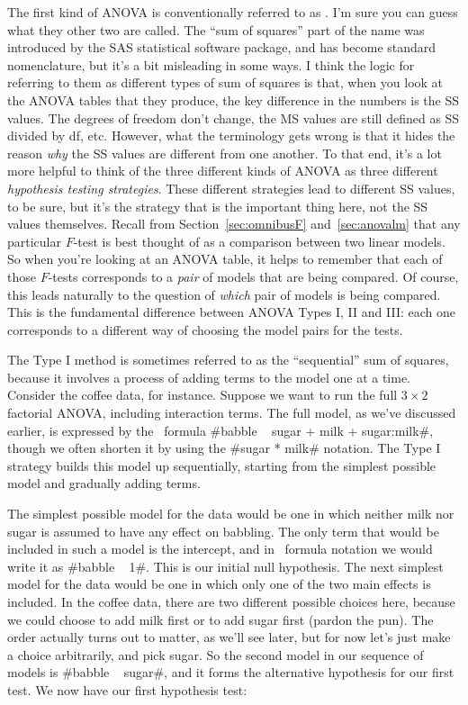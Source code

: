 The first kind of ANOVA is conventionally referred to as . I'm sure you can guess what they other two are called. The ``sum of squares'' part of the name was introduced by the SAS statistical software package, and has become standard nomenclature, but it's a bit misleading in some ways. I think the logic for referring to them as different types of sum of squares is that, when you look at the ANOVA tables that they produce, the key difference in the numbers is the SS values. The degrees of freedom don't change, the MS values are still defined as SS divided by df, etc. However, what the terminology gets wrong is that it hides the reason {\it why} the SS values are different from one another. To that end, it's a lot more helpful to think of the three different kinds of ANOVA as three different {\it hypothesis testing strategies}. These different strategies lead to different SS values, to be sure, but it's the strategy that is the important thing here, not the SS values themselves. Recall from Section~\ref{sec:omnibusF} and~\ref{sec:anovalm} that any particular $F$-test is best thought of as a comparison between two linear models. So when you're looking at an ANOVA table, it helps to remember that each of those $F$-tests corresponds to a {\it pair} of models that are being compared. Of course, this leads naturally to the question of {\it which} pair of models is being compared. This is the fundamental difference between ANOVA Types I, II and III: each one corresponds to a different way of choosing the model pairs for the tests. 



The Type I method is sometimes referred to as the ``sequential'' sum of squares, because it involves a process of adding terms to the model one at a time. Consider the coffee data, for instance. Suppose we want to run the full $3 \times 2$ factorial ANOVA, including interaction terms. The full model, as we've discussed earlier, is expressed by the \R\ formula \rtextverb#babble ~ sugar + milk + sugar:milk#, though we often shorten it by using the \rtextverb#sugar * milk# notation. The Type I strategy builds this model up sequentially, starting from the simplest possible model and gradually adding terms. 

The simplest possible model for the data would be one in which neither milk nor sugar is assumed to have any effect on babbling. The only term that would be included in such a model is the intercept, and in \R\ formula notation we would write it as \rtextverb#babble ~ 1#. This is our initial null hypothesis. The next simplest model for the data would be one in which only one of the two main effects is included. In the coffee data, there are two different possible choices here, because we could choose to add milk first or to add sugar first (pardon the pun). The order actually turns out to matter, as we'll see later, but for now let's just make a choice arbitrarily, and pick sugar. So the second model in our sequence of models is \rtextverb#babble ~ sugar#, and it forms the alternative hypothesis for our first test. We now have our first hypothesis test:

